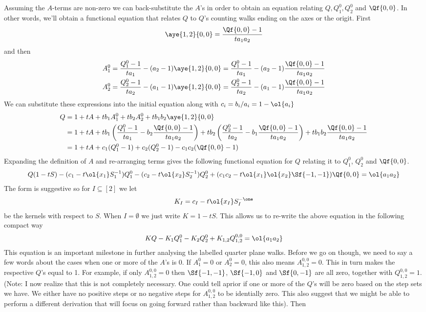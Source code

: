 Assuming the $A$-terms are non-zero we can back-substitute the $A$'s in order to obtain an equation relating $Q, Q_1^0, Q_2^0$ and $\Qf{0,0}$. In other words, we'll obtain a functional equation that relates $Q$ to $Q$'s counting walks ending on the axes or the origit. First
\[
	\aye{1,2}{0,0} = \frac{\Qf{0,0}-1}{ta_1a_2}
\]
and then
\begin{align*}
	A_1^0 = \frac{Q_1^0-1}{ta_1}-(a_2-1)\aye{1,2}{0,0} &= \frac{Q_1^0-1}{ta_1}-(a_2-1)\frac{\Qf{0,0}-1}{ta_1a_2}\\
	A_2^0 = \frac{Q_2^0-1}{ta_2}-(a_1-1)\aye{1,2}{0,0} &= \frac{Q_2^0-1}{ta_2}-(a_1-1)\frac{\Qf{0,0}-1}{ta_1a_2}\\
\end{align*}
We can substitute these expressions into the initial equation along with $c_i = b_i/a_i = 1-\ol{a_i}$
\begin{align*}
	Q &= 1+ tA + tb_1A_1^0+tb_2 A_2^0 + tb_1b_2 \aye{1,2}{0,0}\\
	    &= 1+ t A + tb_1\left(\frac{Q_1^0-1}{ta_1}-b_2\frac{\Qf{0,0}-1}{ta_1a_2}\right)+ tb_2\left(\frac{Q_2^0-1}{ta_2}-b_1\frac{\Qf{0,0}-1}{ta_1a_2}\right)+ tb_1b_2\frac{\Qf{0,0}-1}{ta_1a_2}\\
	    &= 1+ tA + c_1(Q_1^0-1)+c_2(Q_2^0-1)-c_1c_2(\Qf{0,0}-1)
\end{align*}
Expanding the definition of $A$ and re-arranging terms gives the following functional equation for $Q$ relating it to $Q_1^0$, $Q_2^0$ and $\Qf{0,0}$.
\[
	 Q(1-tS) - (c_1-t\ol{x_1}S_1^{-1})Q_1^0 - (c_2-t\ol{x_2}S_2^{-1})Q_2^0 + (c_1c_2-t\ol{x_1}\ol{x_2}\Sf{-1,-1})\Qf{0,0} = \ol{a_1 a_2}
\]
The form is suggestive so for $I\subseteq [2]$ we let
\[
	 K_I = c_I - t \ol{x_I}S_{I}^{-\one}
\]
 be the kernels with respect to $S$. When $I = \emptyset$ we just write $K = 1 - tS$. This allows us to re-write the above equation in the following compact way
\[
	   KQ - K_1 Q_1^0 - K_2 Q_2^0 + K_{1,2}Q_{1,2}^{0,0}= \ol{a_1a_2}
\]
This equation is an important milestone in further analysing the labelled quarter plane walks. Before we go on though, we need to say a few words about the cases when one or more of the $A$'s is 0. If $A_1^0 = 0$ or $A_2^0 = 0$, this also means $A_{1,2}^{0,0} = 0$. This in turn makes the respective $Q$'s equal to 1. For example, if only $A_{1,2}^{0,0} = 0$ then $\Sf{-1,-1}$, $\Sf{-1,0}$ and $\Sf{0,-1}$ are all zero, together with $Q_{1,2}^{0,0} = 1$.(Note: I now realize that this is not completely necessary. One could tell aprior if one or more of the $Q$'s will be zero based on the step sets we have. We either have no positive steps or no negative steps for $A_{1,2}^{0,0}$ to be identially zero. This also suggest that we might be able to perform a different derivation that will focus on going forward rather than backward like this). Then

